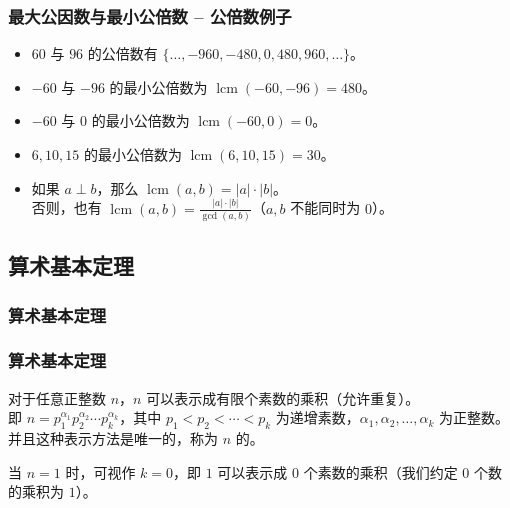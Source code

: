 \documentclass{../pkslide}
\newcommand{\lcm}{\operatorname{lcm}} %
\begin{document}
\begin{frame}
  \frametitle{最大公因数与最小公倍数 -- 公倍数例子}
  
  \begin{examples}[公倍数与最小公倍数]
    \begin{itemize}
      \item<2-> $60$ 与 $96$ 的公倍数有 $\{ \ldots, -960, -480, 0, 480, 960, \ldots \}$。
      \item<2-> $-60$ 与 $-96$ 的最小公倍数为 $\lcm(-60, -96) = 480$。
      \item<3-> $-60$ 与 $0$ 的最小公倍数为 $\lcm(-60, 0) = 0$。
      \item<3-> $6, 10, 15$ 的最小公倍数为 $\lcm(6, 10, 15) = 30$。
      \item<4> 如果 $a \perp b$，那么 $\lcm(a, b) = |a| \cdot |b|$。\\
        否则，也有 $\lcm(a, b) = \frac{|a| \cdot |b|}{\gcd(a, b)}$（$a, b$ 不能同时为 $0$）。
    \end{itemize}
  \end{examples}
\end{frame}


\subsection{算术基本定理}
\subsubsection{算术基本定理}


\begin{frame}
  \frametitle{算术基本定理}
  
  \begin{theorem}
    对于任意正整数 $n$，$n$ 可以表示成有限个素数的乘积（允许重复）。\\
    即 $n = p_1^{\alpha_1} p_2^{\alpha_2} \cdots p_k^{\alpha_k}$，其中 $p_1 < p_2 < \cdots < p_k$ 为递增素数，$\alpha_1, \alpha_2, \ldots, \alpha_k$ 为正整数。并且这种表示方法是唯一的，称为 $n$ 的。
    
    当 $n = 1$ 时，可视作 $k = 0$，即 $1$ 可以表示成 $0$ 个素数的乘积（我们约定 $0$ 个数的乘积为 $1$）。
  \end{theorem}
  
\end{frame}
\end{document}

